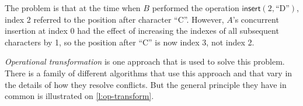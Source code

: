 \begin{frame}
\begin{center}
    \end{center}
\end{frame}
\label{l:text-editing}

The problem is that at the time when $B$ performed the operation $\mathsf{insert}(2, \text{``D''})$, index 2 referred to the position after character ``C''.
However, $A$'s concurrent insertion at index 0 had the effect of increasing the indexes of all subsequent characters by 1, so the position after ``C'' is now index 3, not index 2.

\emph{Operational transformation} is one approach that is used to solve this problem.
There is a family of different algorithms that use this approach and that vary in the details of how they resolve conflicts.
But the general principle they have in common is illustrated on \autoref{l:op-transform}.

